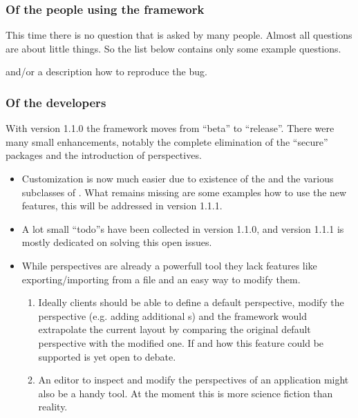 \subsubsection{Of the people using the framework}
This time there is no question that is asked by many people. Almost all questions are about little things. So the list below contains only some example questions.
\begin{itemize}
  and/or a description how to reproduce the bug.
\end{itemize}

\subsubsection{Of the developers}
With version 1.1.0 the framework moves from ``beta'' to ``release''. There were many small enhancements, notably the complete elimination of the ``secure'' packages and the introduction of perspectives.
\begin{itemize}
 \item Customization is now much easier due to existence of the  and the various subclasses of . What remains missing are some examples how to use the new features, this will be addressed in version 1.1.1.
 \item A lot small ``todo''s have been collected in version 1.1.0, and version 1.1.1 is mostly dedicated on solving this open issues.
 \item While perspectives are already a powerfull tool they lack features like exporting/importing from a file and an easy way to modify them.
 \begin{enumerate}
  \item Ideally clients should be able to define a default perspective, modify the perspective (e.g. adding additional s) and the framework would extrapolate the current layout by comparing the original default perspective with the modified one. If and how this feature could be supported is yet open to debate.
  \item An editor to inspect and modify the perspectives of an application might also be a handy tool. At the moment this is more science fiction than reality.
 \end{enumerate}
\end{itemize}

